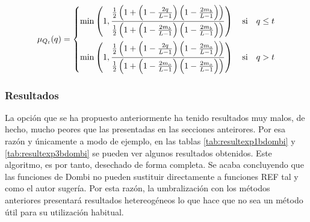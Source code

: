 \begin{equation}\label{eq:intentodesolucionardombi}
    \mu_{Q_t}(q)=\left\{ \begin{split}
                 \min\left( 1, \frac
                    {\frac{1}{2} \left(1+\left(1-\frac{2q}{L-1}\right)\left(1-\frac{2m_b}{L-1}\right)\right)}
                    {\frac{1}{2} \left(1+\left(1-\frac{2m_b}{L-1}\right)\left(1-\frac{2m_b}{L-1}\right)\right)}\right)
                 \text{\quad si\quad} q\leq t\\
                 \min\left( 1, \frac
                    {\frac{1}{2} \left(1+\left(1-\frac{2q}{L-1}\right)\left(1-\frac{2m_o}{L-1}\right)\right)}
                    {\frac{1}{2} \left(1+\left(1-\frac{2m_o}{L-1}\right)\left(1-\frac{2m_o}{L-1}\right)\right)}\right)
                \text{\quad si\quad} q > t
                \end{split}\right.
\end{equation}



\subsubsection{Resultados}
La opción que se ha propuesto anteriormente ha tenido resultados muy malos, de hecho, mucho peores que las presentadas en las secciones anteirores. Por esa razón y únicamente a modo de ejemplo, en las tablas \ref{tab:resultexp1bdombi} y \ref{tab:resultexp3bdombi} se pueden ver algunos resultados obtenidos. Este algoritmo, es por tanto, desechado de forma completa. Se acaba concluyendo que las funciones de Dombi no pueden sustituir directamente a funciones REF tal y como el autor sugería. Por esta razón, la umbralización con los métodos anteriores presentará resultados hetereogéneos lo que hace que no sea un método útil para su utilización habitual.

